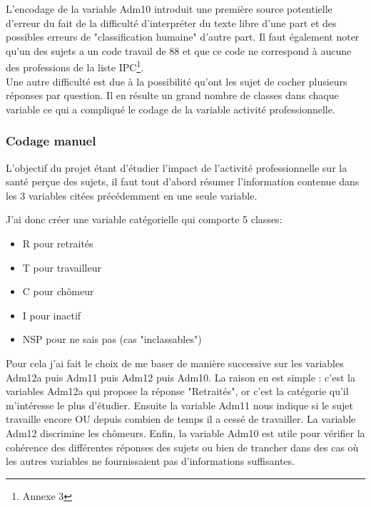 \documentclass{book}
\begin{document}
\noindent
L'encodage de la variable Adm10 introduit une première source potentielle d'erreur du fait de la difficulté d'interpréter du texte libre d'une part et des possibles erreurs de "classification humaine" d'autre part. Il faut également noter qu'un des sujets a un code travail de 88 et que ce code ne correspond à aucune des professions de la liste IPC\footnote{Annexe 3}.\\

\noindent
Une autre difficulté est due à la possibilité qu'ont les sujet de cocher plusieurs réponses par question. Il en résulte un grand nombre de classes dans chaque variable ce qui a compliqué le codage de la variable activité professionnelle.

\subsubsection{Codage manuel}
\noindent
L'objectif du projet étant d'étudier l'impact de l'activité professionnelle sur la santé perçue des sujets, il faut tout d'abord résumer l'information contenue dans les 3 variables citées précédemment en une seule variable.

\noindent
J'ai donc créer une variable catégorielle qui comporte 5 classes:
\begin{itemize}[label=\textbullet, font=\small \color{black} ]
\item R pour retraités
\item T pour travailleur
\item C pour chômeur
\item I pour inactif
\item NSP pour ne sais pas (cas "inclassables")
\end{itemize}

\noindent
Pour cela j'ai fait le choix de me baser de manière successive sur les variables Adm12a puis Adm11 puis Adm12 puis Adm10. La raison en est simple : c'est la variables Adm12a qui propose la réponse "Retraités", or c'est la catégorie qu'il m'intéresse le plus d'étudier. Ensuite la variable Adm11 nous indique si le sujet travaille encore OU depuis combien de temps il a cessé de travailler. La variable Adm12 discrimine les chômeurs. Enfin, la variable Adm10 est utile pour vérifier la cohérence des différentes réponses des sujets ou bien de trancher dans des cas où les autres variables ne fournissaient pas d'informations suffisantes.\\
\end{document}
